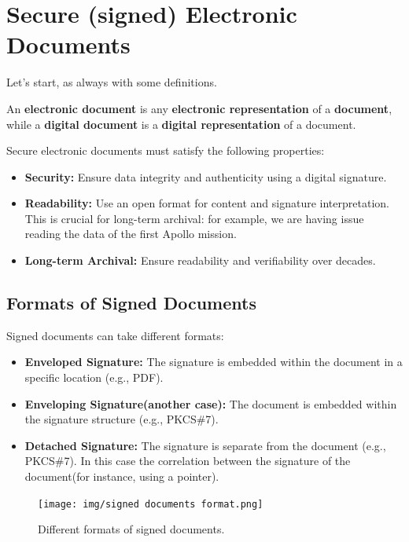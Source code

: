 \chapter{Secure (signed) Electronic Documents}

Let's start, as always with some definitions.
\begin{boxH}
  An \textbf{electronic document} is any \textbf{electronic
  representation} of a \textbf{document}, while a \textbf{digital
  document} is a \textbf{digital representation} of a document.
\end{boxH}

Secure electronic documents must satisfy the following properties:
\begin{itemize}
    \item \textbf{Security:} Ensure data integrity and authenticity
      using a digital signature.
    \item \textbf{Readability:} Use an open format for content and
      signature interpretation. This is crucial for long-term 
      archival: for example, we are having issue reading the data of
      the first Apollo mission.
    \item \textbf{Long-term Archival:} Ensure readability and
      verifiability over decades.
\end{itemize}

\section{Formats of Signed Documents}
Signed documents can take different formats:
\begin{itemize}
    \item \textbf{Enveloped Signature:} The signature is embedded
      within the document in a specific location (e.g., PDF).
    \item \textbf{Enveloping Signature(another case):} The document is
      embedded within the signature structure (e.g., PKCS\#7).
    \item \textbf{Detached Signature:} The signature is separate from
      the document (e.g., PKCS\#7). In this case the correlation
      between the signature of the document(for instance, using a
      pointer).
\end{itemize}

\begin{figure}[H]
  \centering
  \texttt{[image: img/signed documents
  format.png]}
  \caption{Different formats of signed documents.}
\end{figure}

